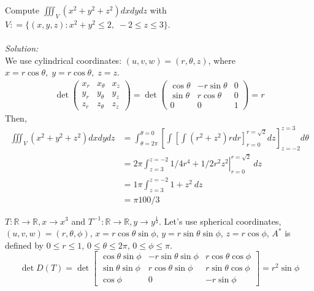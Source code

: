 \documentclass[12pt]{book}
\theoremstyle{definition}
\theoremstyle{remark}
\newcommand\sol{%
  \\ 
  \\
  \textit{Solution:}\\%
}
\begin{document}
  \begin{example}Compute $\iiint_V (x^2 + y^2 + z^2) dx dy dz$ with $V : = \{(x,y,z): x^2 + y^2 \leq 2, \; -2 \leq z \leq 3\}$. 
    \sol 
    We use cylindrical coordinates: $(u,v,w) = (r, \theta , z)$, where $x = r \cos \theta , \; y = r\cos \theta , \; z = z$. 
    \begin{equation*}
      \begin{split}
      \det \begin{pmatrix}
        x_r &x_\theta &x_z \\ y_r & y_\theta &y_z \\ z_r & z_\theta &z_z
      \end{pmatrix} = \det \begin{pmatrix}
        \cos \theta & - r \sin \theta & 0 \\ \sin \theta & r \cos \theta & 0 \\ 0 &0 &1
      \end{pmatrix} = r 
      \end{split}
    \end{equation*}
    Then, 
    \begin{equation*}
      \begin{split}
        \iiint_V (x^2 + y^2 + z^2 ) dx dydz &= \int_{{\theta =2 \pi}}^{{\theta = 0 }}\left[ \int \left[ \int (r^2 + z^2) r dr \right]^{r = \sqrt{2}}_{r=0} dz\right]^{z = 3}_{z = -2} d\theta \\ 
        &=\left. 2 \pi \int_{{z = 3}}^{{z = -2}} 1/4 r^4 + 1/2 r^2 z^2 \right|^{r = \sqrt{2}}_{r=0} \: d{z} {}\\ 
        &= 1 \pi \int_{{z = 3}}^{{z = -2}} {1 + z^2} \: d{z} \\ 
        &= \pi 100/3 
      \end{split}
    \end{equation*}
  \end{example}
\begin{example}
  $T: \mathbb{R} \rightarrow \mathbb{R}, x \rightarrow x^3$ and $T^{-1} : \mathbb{R} \rightarrow \mathbb{R}, y \rightarrow y^{\frac{1}{3}}$. Let's use spherical coordinates, $(u,v,w) = (r, \theta, \phi)$, $x = r \cos \theta \sin \phi$, $y = r \sin \theta \sin \phi$, $z = r \cos \phi$, $A^*$ is defined by $0 \leq r \leq 1$, $0 \leq \theta \leq 2 \pi$, $0 \leq \phi \leq \pi$.
$$
\det D(T) = \det \begin{bmatrix} \cos \theta \sin \phi & -r \sin \theta \sin \phi & r \cos \theta \cos \phi \\ \sin \theta \sin \phi & r \cos \theta \sin \phi & r \sin \theta \cos \phi \\ \cos \phi & 0 & -r \sin \phi \end{bmatrix} = r^2 \sin \phi
$$

\end{example}
\end{document}
